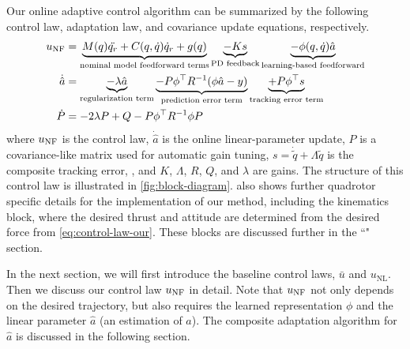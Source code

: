 Our online adaptive control algorithm can be summarized by the following control law, adaptation law, and covariance update equations, respectively.
\begin{align}
    \label{eq:control-law-our}
    u_\text{NF} &= \underbrace{M(q) \ddot{q_r} + C(q, \dot q) \dot q_r + g(q)}_{\text{nominal model feedforward terms}} \underbrace{- K s}_{\text{PD feedback}} \underbrace{- \phi(q, \dot q) \hat a}_{\text{learning-based feedforward}}
    \\
    \label{eq:adaptation-law-a}
    \dot{\hat{a}} &= \underbrace{-\lambda \hat{a}}_{\text{regularization term}} \underbrace{- P \phi^\top R^{-1} (\phi \hat{a} - y)}_{\text{prediction error term}} \underbrace{+P \phi^\top s}_{\text{tracking error term}} \\
    \label{eq:adaptation-law-P}
    \dot{P} &= - 2 \lambda P + Q - P \phi ^\top R^{-1} \phi P
\end{align}
where $u_\text{NF}$ is the control law, $\dot{\hat{a}}$ is the online linear-parameter update, $P$ is a covariance-like matrix used for automatic gain tuning, $s=\dot{\tilde{q}}+\Lambda\tilde{q}$ is the composite tracking error, , and $K$, $\Lambda$, $R$, $Q$, and $\lambda$ are gains. The structure of this control law is illustrated in \cref{fig:block-diagram}.  also shows further quadrotor specific details for the implementation of our method, including the kinematics block, where the desired thrust and attitude are determined from the desired force from \cref{eq:control-law-our}. These blocks are discussed further in the ``" section.

In the next section, we will first introduce the baseline control laws, $\bar{u}$ and $u_\text{NL}$.  Then we discuss our control law $u_\text{NF}$ in detail. Note that $u_\text{NF}$ not only depends on the desired trajectory, but also requires the learned representation $\phi$ and the linear parameter $\hat{a}$ (an estimation of $a$). The composite adaptation algorithm for $\hat{a}$ is discussed in the following section.

